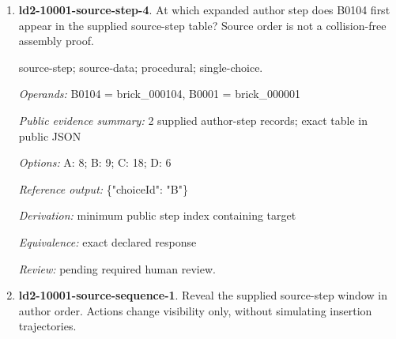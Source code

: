 \begin{enumerate}
\item \textbf{ld2-10001-source-step-4}. At which expanded author step does B0104 first appear in the supplied source-step table? Source order is not a collision-free assembly proof.
\par{\small source-step; source-data; procedural; single-choice.\par\textit{Operands:} B0104 = brick\_000104, B0001 = brick\_000001\par\textit{Public evidence summary:} 2 supplied author-step records; exact table in public JSON\par\textit{Options:} A: 8; B: 9; C: 18; D: 6\par\textit{Reference output:} \{"choiceId": "B"\}\par\textit{Derivation:} minimum public step index containing target\par\textit{Equivalence:} exact declared response\par\textit{Review:} pending required human review.}
\item \textbf{ld2-10001-source-sequence-1}. Reveal the supplied source-step window in author order. Actions change visibility only, without simulating insertion trajectories.

\end{enumerate}
